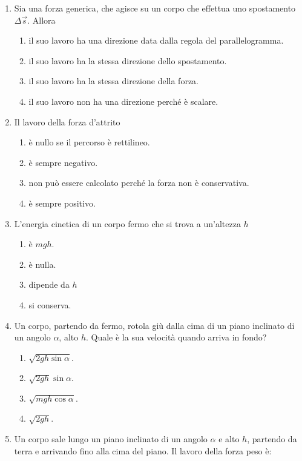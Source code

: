 \documentclass{article}
\begin{document}
\begin{enumerate}
  \item Sia  una forza generica, che agisce su un corpo che effettua uno spostamento $\Delta \vec{s}$. Allora
  \begin{enumerate}[label=\Alph*.]
    \item il suo lavoro ha una direzione data dalla regola del parallelogramma.
    \item il suo lavoro ha la stessa direzione dello spostamento.
    \item il suo lavoro ha la stessa direzione della forza.
    \item il suo lavoro non ha una direzione perché è scalare.
  \end{enumerate}
  \item Il lavoro della forza d'attrito
  \begin{enumerate}[label=\Alph*.]
    \item è nullo se il percorso è rettilineo.
    \item è sempre negativo.
    \item non può essere calcolato perché la forza non è conservativa.
    \item è sempre positivo.
  \end{enumerate}
  \item L'energia cinetica di un corpo fermo che si trova a un'altezza $h$
  \begin{enumerate}[label=\Alph*.]
    \item è $mgh$.
    \item è nulla.
    \item dipende da $h$
    \item si conserva.
  \end{enumerate}
  \item Un corpo, partendo da fermo, rotola giù dalla cima di un piano inclinato di un angolo $\alpha$, alto $h$. Quale è la sua velocità quando arriva in fondo?
  \begin{enumerate}[label=\Alph*.]
    \item $\sqrt{2gh\sin\alpha}$.
    \item $\sqrt{2gh}\sin\alpha$.
    \item $\sqrt{mgh\cos\alpha}$.
    \item $\sqrt{2gh}$.
  \end{enumerate}
  \item Un corpo sale lungo un piano inclinato di un angolo $\alpha$ e alto $h$, partendo da terra e arrivando fino alla cima del piano. Il lavoro della forza peso è:
  \begin{enumerate}[label=\Alph*.]

\end{enumerate}
\end{enumerate}
\end{document}
